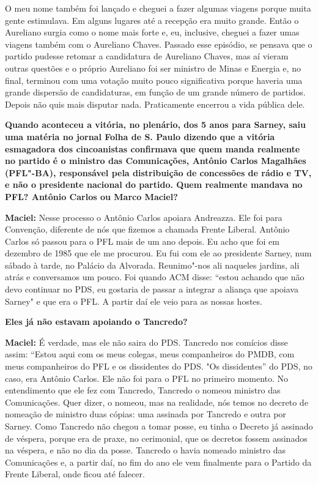 O meu nome também foi lançado e cheguei a fazer algumas viagens porque
muita gente estimulava. Em alguns lugares até a recepção era muito
grande. Então o Aureliano surgia como o nome mais forte e, eu,
inclusive, cheguei a fazer umas viagens também com o Aureliano Chaves.
Passado esse episódio, se pensava que o partido pudesse retomar a
candidatura de Aureliano Chaves, mas aí vieram outras questões e o
próprio Aureliano foi ser ministro de Minas e Energia e, no final,
terminou com uma votação muito pouco significativa porque haveria uma
grande dispersão de candidaturas, em função de um grande número de
partidos. Depois não quis mais disputar nada. Praticamente encerrou a
vida pública dele.

\textbf{Quando aconteceu a vitória, no plenário, dos 5 anos para Sarney,
saiu uma matéria no jornal Folha de S. Paulo dizendo que a vitória
esmagadora dos cincoanistas confirmava que quem manda realmente no
partido é o ministro das Comunicações, Antônio Carlos Magalhães
(PFL"-BA), responsável pela distribuição de concessões de rádio e TV, e
não o presidente nacional do partido. Quem realmente mandava no PFL?
Antônio Carlos ou Marco Maciel? }

\textbf{Maciel:} Nesse processo o Antônio Carlos apoiara Andreazza. Ele
foi para Convenção, diferente de nós que fizemos a chamada Frente
Liberal. Antônio Carlos só passou para o PFL mais de um ano depois. Eu
acho que foi em dezembro de 1985 que ele me procurou. Eu fui com ele ao
presidente Sarney, num sábado à tarde, no Palácio da Alvorada.
Reunimo"-nos ali naqueles jardins, ali atrás e conversamos um pouco. Foi
quando ACM disse: ``estou achando que não devo continuar no PDS, eu
gostaria de passar a integrar a aliança que apoiava Sarney" e que era o
PFL. A partir daí ele veio para as nossas hostes.

\textbf{Eles já não estavam apoiando o Tancredo? }

\textbf{Maciel:} É verdade, mas ele não saira do PDS. Tancredo nos
comícios disse assim: ``Estou aqui com os meus colegas, meus
companheiros do PMDB, com meus companheiros do PFL e os dissidentes do
PDS. "Os dissidentes'' do PDS, no caso, era Antônio Carlos. Ele não foi
para o PFL no primeiro momento. No entendimento que ele fez com
Tancredo, Tancredo o nomeou ministro das Comunicações. Quer dizer, o
nomeou, mas na realidade, nós temos no decreto de nomeação de ministro
duas cópias: uma assinada por Tancredo e outra por Sarney. Como Tancredo
não chegou a tomar posse, eu tinha o Decreto já assinado de véspera,
porque era de praxe, no cerimonial, que os decretos fossem assinados na
véspera, e não no dia da posse. Tancredo o havia nomeado ministro das
Comunicações e, a partir daí, no fim do ano ele vem finalmente para o
Partido da Frente Liberal, onde ficou até falecer.


